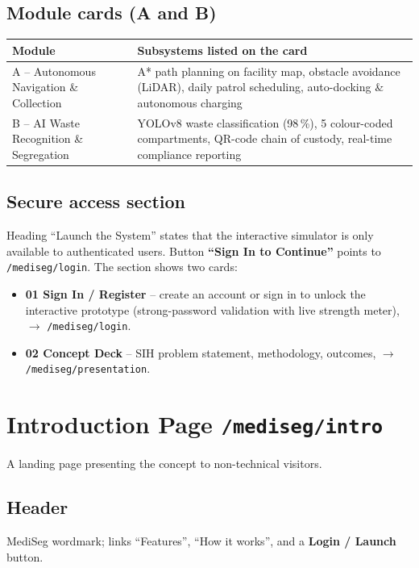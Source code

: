 \documentclass[11pt, a4paper]{article}
\begin{document}
\subsection{Module cards (A and B)}
\begin{tabularx}{\textwidth}{lX}
  \toprule
  \textbf{Module} & \textbf{Subsystems listed on the card}\\
  \midrule
  A -- Autonomous Navigation \& Collection &
    A* path planning on facility map, obstacle avoidance (LiDAR), daily patrol
    scheduling, auto-docking \& autonomous charging\\
  B -- AI Waste Recognition \& Segregation &
    YOLOv8 waste classification (98\,\%), 5 colour-coded compartments,
    QR-code chain of custody, real-time compliance reporting\\
  \bottomrule
\end{tabularx}

\subsection{Secure access section}
Heading ``Launch the System'' states that the interactive simulator is only
available to authenticated users. Button \textbf{``Sign In to Continue''}
points to \texttt{/mediseg/login}. The section shows two cards:
\begin{itemize}[leftmargin=1.6em, itemsep=2pt]
  \item \textbf{01 Sign In / Register} -- create an account or sign in to
        unlock the interactive prototype (strong-password validation with live
        strength meter), $\rightarrow$ \texttt{/mediseg/login}.
  \item \textbf{02 Concept Deck} -- SIH problem statement, methodology,
        outcomes, $\rightarrow$ \texttt{/mediseg/presentation}.
\end{itemize}

\section{Introduction Page \texttt{/mediseg/intro}}

A landing page presenting the concept to non-technical visitors.

\subsection{Header}
MediSeg wordmark; links ``Features'', ``How it works'', and a
\textbf{Login / Launch} button.
\end{document}
